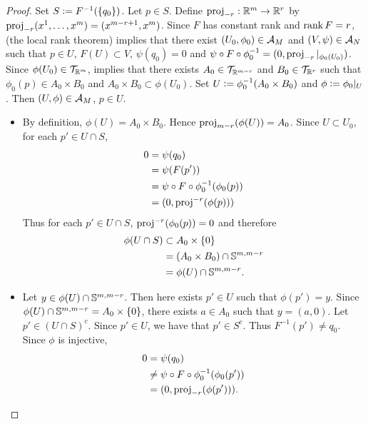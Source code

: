 \documentclass{book}
\begin{document}
	\begin{proof}
		Set $S \defeq F^{-1}(\{q_0\})$. Let $p \in S$. Define $\prj_{-r}: \R^m \rightarrow \R^{r}$ by $\prj_{-r}(x^1, \ldots, x^m) = (x^{m-r+1}, x^{m})$. Since $F$ has constant rank and $\rnk F = r$,  (the local rank theorem)  implies that there exist $(U_0, \phi_0) \in \MA_M$ and $(V, \psi) \in \MA_N$ such that $p \in U$, $F(U) \subset V$, $\psi(q_0) = 0$ and $\psi \circ F \circ \phi_0^{-1} = (0, \prj_{-r}|_{\phi_0(U_0)})$. Since $\phi(U_0) \in \MT_{\R^m}$,  implies that there exists $A_0 \in \MT_{\R^{m-r}}$ and $B_0 \in \MT_{\R^{r}}$ such that $\phi_0(p) \in A_0 \times B_0$ and $A_0 \times B_0 \subset \phi(U_0)$. Set $U \defeq \phi_0^{-1}(A_0 \times B_0)$ and $\phi \defeq \phi_0|_U$. Then $(U, \phi) \in \MA_M$, $p \in U$. 
		\begin{itemize}
			\item By definition, $\phi(U) = A_0 \times B_0$. Hence $\prj_{m-r}(\phi(U)) = A_0$. Since $U \subset U_0$, for each $p' \in U \cap S$, 
			\begin{align*}
				0
				& = \psi(q_0) \\
				& = \psi(F(p')) \\
				& = \psi \circ F \circ \phi_0^{-1}(\phi_0(p)) \\
				& = (0, \prj^{-r}(\phi(p)))
			\end{align*}
			Thus for each $p' \in U \cap S$, $\prj^{-r}(\phi_0(p)) = 0$ and therefore 
			\begin{align*}
				\phi(U \cap S) 
				& \subset A_0 \times \{0\} \\
				& = (A_0 \times B_0) \cap \S^{m, m-r} \\
				& = \phi(U) \cap \S^{m, m-r}.
			\end{align*}
			\item Let $y \in \phi(U) \cap \S^{m, m-r}$. Then here exists $p' \in U$ such that $\phi(p') = y$. Since  $\phi(U) \cap \S^{m, m-r} = A_0 \times \{0\}$, there exists $a \in A_0$ such that $y = (a, 0)$. Let $p' \in (U \cap S)^c$. Since $p' \in U$, we have that $p' \in S^c$. Thus $F^{-1}(p') \neq q_0$. Since $\phi$ is injective, 
			\begin{align*}
				0
				& = \psi(q_0) \\
				& \neq \psi \circ F \circ \phi_0^{-1}(\phi_0(p')) \\
				& = (0, \prj_{-r}(\phi(p'))).

\end{align*}
\end{itemize}
\end{proof}
\end{document}

